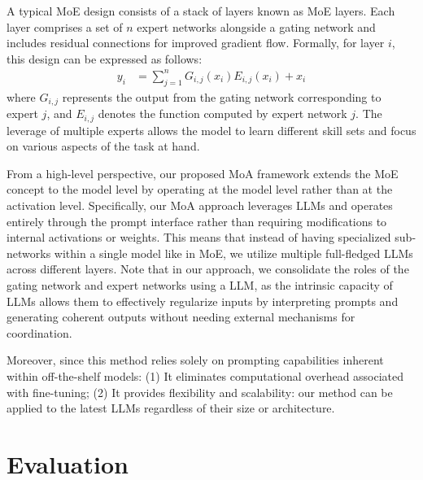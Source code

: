 \documentclass{article}
\begin{document}
A typical MoE design consists of a stack of layers known as MoE layers. 
Each layer comprises a set of \(n\) expert networks alongside a gating network and includes residual connections for improved gradient flow.
Formally, for layer \(i\), this design can be expressed as follows:
\begin{align}
    y_i &= \sum_{j=1}^n {G_{i,j}(x_i) E_{i,j}(x_i)} + x_i 
    \label{eq:moe}
\end{align}
where \(G_{i,j}\) represents the output from the gating network corresponding to expert \(j\), and \(E_{i,j}\) denotes the function computed by expert network \(j\).
The leverage of multiple experts allows the model to learn different skill sets and focus on various aspects of the task at hand.

From a high-level perspective, our proposed MoA framework extends the MoE concept to the model level by operating at the model level rather than at the activation level.
Specifically, our MoA approach leverages LLMs and operates entirely through the prompt interface rather than requiring modifications to internal activations or weights. 
This means that instead of having specialized sub-networks within a single model like in MoE, 
we utilize multiple full-fledged LLMs across different layers.
Note that in our approach, we consolidate the roles of the gating network and expert networks using a LLM, 
as the intrinsic capacity of LLMs allows them to effectively regularize inputs by interpreting prompts and generating coherent outputs without needing external mechanisms for coordination.

Moreover, since this method relies solely on prompting capabilities inherent within off-the-shelf models:
(1) It eliminates computational overhead associated with fine-tuning;
(2) It provides flexibility and scalability: our method can be applied to the latest LLMs regardless of their size or architecture.



\section{Evaluation}
\label{section:evaluation}
\end{document}
